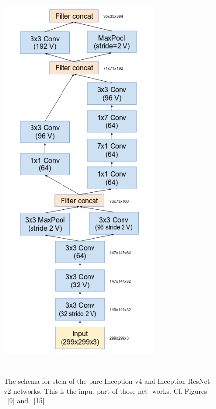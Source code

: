 \documentclass[a4paper,12pt, twoside]{NITKReport}
\begin{document}
\begin{figure}[h]
  \centering
    
    \includegraphics[height=21cm, width=8cm]{figure3.png}
    \caption{The  schema  for  stem  of  the  pure  Inception-v4  and
Inception-ResNet-v2 networks. This is the input part of those net-
works. Cf. Figures ~\ref{9} and ~\ref{15}}
    \label{3}
  
\end{figure}
\end{document}
